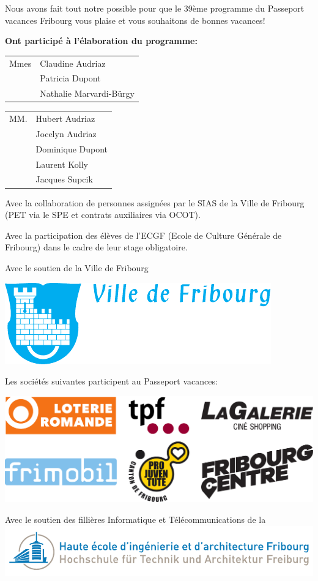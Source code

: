 \cleardoublepage
Nous avons fait tout notre possible pour que le 39ème programme du Passeport vacances Fribourg vous plaise et vous souhaitons de bonnes vacances!
	
\textbf{Ont participé à l'élaboration du programme:}

\begin{tabular}{p{1.6cm} l}
Mmes & Claudine Audriaz \\
& Patricia Dupont \\
& Nathalie Marvardi-Bürgy \\
\end{tabular}

\begin{tabular}{p{1.6cm} l}
	MM. & Hubert Audriaz \\
	& Jocelyn Audriaz \\
	& Dominique Dupont \\
	& Laurent Kolly \\
	& Jacques Supcik \\
\end{tabular}

Avec la collaboration de personnes assignées par le SIAS de la Ville de Fribourg (PET via le SPE et contrats auxiliaires via OCOT). 

Avec la participation des élèves de l'ECGF (Ecole de Culture Générale de Fribourg) dans le cadre de leur stage obligatoire.

{\centering
	{\LARGE Avec le soutien de la Ville de Fribourg}
	
	\includegraphics[width=.4\textwidth]{ville.pdf}
	\vfill
	\par

	{\LARGE Les sociétés suivantes participent au Passeport vacances:}
	
	\includegraphics[width=.8\textwidth]{pub0.pdf}
	\vfill
	\par
	
	{\LARGE Avec le soutien des fillières Informatique et Télécommunications de la}
	\includegraphics[width=.8\textwidth]{heiafr.pdf}
	\par
}

